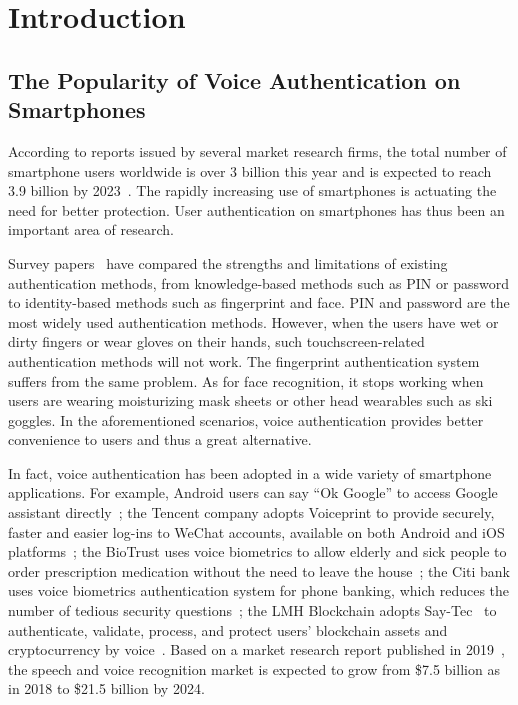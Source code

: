 \section{Introduction}

\subsection{The Popularity of Voice Authentication on Smartphones}

According to reports issued by several market research firms, the total number of smartphone users worldwide is over 3 billion this year and is expected to reach 3.9 billion by 2023~\cite{report2018newzoo,report2019forrester}. The rapidly increasing use of smartphones is actuating the need for better protection. User authentication on smartphones has thus been an important area of research. 

Survey papers~\cite{vongsingthong2014survey,mahfouz2017survey,shankar2018survey} have compared the strengths and limitations of existing authentication methods, from knowledge-based methods such as PIN or password to identity-based methods such as fingerprint and face.
%
PIN and password are the most widely used authentication methods. However, when the users have wet or dirty fingers or wear gloves on their hands, such touchscreen-related authentication methods will not work. The fingerprint authentication system suffers from the same problem. As for face recognition, it stops working when users are wearing moisturizing mask sheets or other head wearables such as ski goggles. In the aforementioned scenarios, voice authentication provides better convenience to users and thus a great alternative.


In fact, voice authentication has been adopted in a wide variety of smartphone applications. 
For example, Android users can say ``Ok Google'' to access Google assistant directly~\cite{onlinegoogle}; the Tencent company adopts Voiceprint to provide securely, faster and easier log-ins to WeChat accounts, available on both Android and iOS platforms~\cite{onlinewechat}; the BioTrust uses voice biometrics to allow elderly and sick people to order prescription medication without the need to leave the house~\cite{onlinebio}; the Citi bank uses voice biometrics authentication system for phone banking, which reduces the number of tedious security questions~\cite{onlineciti}; the LMH Blockchain adopts Say-Tec~\cite{onlinesaytec} to authenticate, validate, process, and protect users' blockchain assets and cryptocurrency by voice~\cite{onlineblockchain}.
%
Based on a market research report published in 2019~\cite{onlinemarket}, the speech and voice recognition market is expected to grow from 
 \$7.5 billion as in 2018 to \$21.5 billion by 2024. 
 
